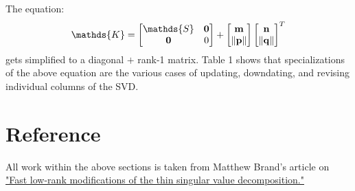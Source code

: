 \documentclass{article}
\begin{document}
\bigskip



The equation:
$$
\mathds{K}=
\begin{bmatrix}
\mathds{S} & \bf{0}\\
\bf{0} & 0
\end{bmatrix}
+
\begin{bmatrix}
\bf{m}\\
\|\bf{p}\|
\end{bmatrix}
\begin{bmatrix}
\bf{n}\\
\|\bf{q}\|
\end{bmatrix}^T
$$
gets simplified to a diagonal $+$ rank-1 matrix.
Table 1 shows that specializations of the above equation are the various cases of updating, downdating, and revising individual columns of the SVD.




\section{Reference\label{reference}}
All work within the above sections is taken from Matthew Brand's article on \href{http://www.stat.osu.edu/~dmsl/thinSVDtracking.pdf}{"Fast low-rank modifications of the thin singular value decomposition."}
\end{document}
